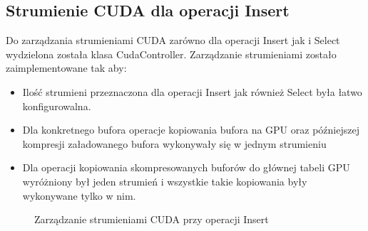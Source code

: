 \documentclass[paper=a4, fontsize=11pt]{scrartcl} %
\numberwithin{equation}{section} %
\numberwithin{figure}{section} %
\numberwithin{table}{section} %
\begin{document}
	\subsection{Strumienie CUDA dla operacji Insert}
		Do zarządzania strumieniami CUDA zarówno dla operacji Insert jak i Select wydzielona została klasa CudaController. Zarządzanie strumieniami zostało zaimplementowane tak aby:
		\begin{itemize}
			\item Ilość strumieni przeznaczona dla operacji Insert jak również Select była łatwo konfigurowalna. 
			\item Dla konkretnego bufora operacje kopiowania bufora na GPU oraz późniejszej kompresji załadowanego bufora wykonywały się w jednym strumieniu
			\item Dla operacji kopiowania skompresowanych buforów do głównej tabeli GPU wyróżniony był jeden strumień i wszystkie takie kopiowania były wykonywane tylko w nim.
		\end{itemize}
		\begin{figure}[t]
			\begin{center}
				\caption{Zarządzanie strumieniami CUDA przy operacji Insert}
			\end{center}
		\end{figure}
		\clearpage
\end{document}
